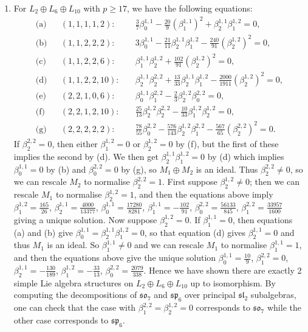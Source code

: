 \documentclass[11pt,a4paper,reqno]{amsart}
\theoremstyle{definition}
\numberwithin{equation}{section}
\newcommand{\fsl}{\mathfrak{sl}}
\newcommand{\fso}{\mathfrak{so}}
\newcommand{\fsp}{\mathfrak{sp}}
\begin{document}
\begin{enumerate}
\item For $L_2\oplus L_6\oplus L_{10}$ with $p\geq17$, we have the following equations:
\begin{align*}
\text{(a)}&&(1,1,1,1,2):\quad&\textstyle \frac37\beta^{1,1}_0-\frac{20}9(\beta^{1,1}_1)^2+\beta^{1,1}_2\beta^{1,2}_1=0,\\
\text{(b)}&&(1,1,2,2,2):\quad&\textstyle 3\beta^{1,1}_0-\frac{21}{11}\beta^{1,1}_2\beta^{1,2}_1-\frac{240}{91}(\beta^{1,2}_2)^2=0,\\
\text{(c)}&&(1,1,2,2,6):\quad&\textstyle \beta^{1,1}_1\beta^{1,2}_2+\frac{102}{91}(\beta^{1,2}_2)^2=0,\\
\text{(d)}&&(1,1,2,2,10):\quad&\textstyle \beta^{1,1}_2\beta^{2,2}_2+\frac{13}{33}\beta^{1,1}_2\beta^{1,2}_1-\frac{2000}{1911}(\beta^{1,2}_2)^2=0,\\
\text{(e)}&&(2,2,1,0,6):\quad&\textstyle \beta^{1,1}_0\beta^{2,2}_1-\frac23\beta^{1,2}_2\beta^{2,2}_0=0,\\
\text{(f)}&&(2,2,1,2,10):\quad&\textstyle \frac{25}{13}\beta^{1,2}_2\beta^{2,2}_2-\frac{10}{33}\beta^{1,2}_1\beta^{1,2}_2=0,\\
\text{(g)}&&(2,2,2,2,2):\quad&\textstyle \frac{78}{55}\beta^{2,2}_0-\frac{576}{143}\beta^{1,2}_2\beta^{2,2}_1-\frac{567}{65}(\beta^{2,2}_2)^2=0.
\end{align*}
If $\beta^{2,2}_2=0$, then either $\beta^{1,2}_1=0$ or $\beta^{1,2}_2=0$ by (f), but the first of these implies the second by (d). We then get $\beta^{1,1}_2\beta^{1,2}_1=0$ by (d) which implies $\beta^{1,1}_0=0$ by (b) and $\beta^{2,2}_0=0$ by (g), so $M_1\oplus M_2$ is an ideal. Thus $\beta^{2,2}_2\neq0$, so we can rescale $M_2$ to normalise $\beta^{2,2}_2=1$. First suppose $\beta^{1,2}_2\neq0$; then we can rescale $M_1$ to normalise $\beta^{1,2}_2=1$, and then the equations above imply $\beta^{1,2}_1=\frac{165}{26}$, $\beta^{1,1}_2=\frac{4000}{13377}$, $\beta^{1,1}_0=\frac{17280}{8281}$, $\beta^{1,1}_1=-\frac{102}{91}$, $\beta^{2,2}_0=\frac{56133}{845}$, $\beta^{2,2}_1=\frac{33957}{1600}$ giving a unique solution. Now suppose $\beta^{1,2}_2=0$. If $\beta^{1,1}_1=0$, then equations (a) and (b) give $\beta^{1,1}_0=\beta^{1,1}_2\beta^{1,2}_1=0$, so that equation (d) gives $\beta^{1,1}_2=0$ and thus $M_1$ is an ideal. So $\beta^{1,1}_1\neq0$ and we can rescale $M_1$ to normalise $\beta^{1,1}_1=1$, and then the equations above give the unique solution $\beta^{1,1}_0=\frac{10}9$, $\beta^{2,2}_1=0$, $\beta^{1,1}_2=-\frac{130}{189}$, $\beta^{1,2}_1=-\frac{33}{13}$, $\beta^{2,2}_0=\frac{2079}{338}$. Hence we have shown there are exactly 2 simple Lie algebra structures on $L_2\oplus L_6\oplus L_{10}$ up to isomorphism. By computing the decompositions of $\fso_7$ and $\fsp_6$ over principal $\fsl_2$ subalgebras, one can check that the case with $\beta^{2,2}_1=\beta^{1,2}_2=0$ corresponds to $\fso_7$ while the other case corresponds to $\fsp_6$.


\end{enumerate}
\end{document}
